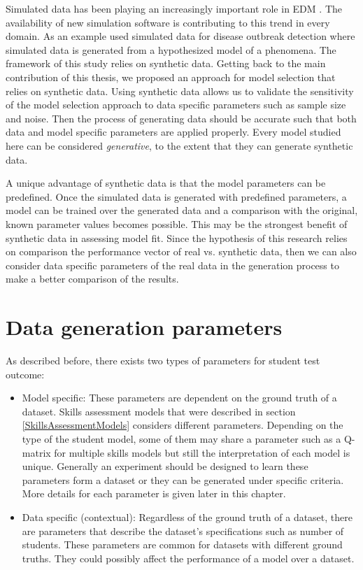 \label{sec:Syn}


Simulated data has been playing an increasingly important role in EDM \citep{JEDM:baker2009}. The availability of new simulation software is contributing to this trend in every domain. As an example \citet{jafarpour2015quantifying} used simulated data for disease outbreak detection where simulated data is generated from a hypothesized model of a phenomena. The framework of this study relies on synthetic data. Getting back to the main contribution of this thesis, we proposed an approach for model selection that relies on synthetic data. Using synthetic data allows us to validate the sensitivity of the model selection approach to data specific parameters such as sample size and noise. Then the process of generating data should be accurate such that both data  and model specific parameters are applied properly. Every model studied here can be considered \textit{generative}, to the extent that they can generate synthetic data.

A unique advantage of synthetic data is that the model parameters can be predefined. Once the simulated data is generated with predefined parameters, a model can be trained over the generated data and a comparison with the original, known parameter values becomes possible. This may be the strongest benefit of synthetic data in assessing model fit. Since the hypothesis of this research relies on comparison the performance vector of real vs. synthetic data, then we can also consider data specific parameters of the real data in the generation process to make a better comparison of the results.

\section{Data generation parameters}
As described before, there exists two types of parameters for student test outcome:
\begin{itemize}
\item Model specific: These parameters are dependent on the ground truth of a dataset. Skills assessment models that were described in section \ref{SkillsAssessmentModels} considers different parameters. Depending on the type of the student model, some of them may share a parameter such as a Q-matrix for multiple skills models but still the interpretation of each model is unique. Generally an experiment should be designed to learn these parameters form a dataset or they can be generated under specific criteria. More details for each parameter is given later in this chapter.
\item Data specific (contextual): Regardless of the ground truth of a dataset, there are parameters that describe the dataset's specifications such as number of students. These parameters are common for datasets with different ground truths. They could possibly affect the performance of a model over a dataset. 
\end{itemize}


